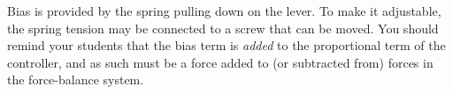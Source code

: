 





Bias is provided by the spring pulling down on the lever.  To make it adjustable, the spring tension may be connected to a screw that can be moved.  You should remind your students that the bias term is {\it added} to the proportional term of the controller, and as such must be a force added to (or subtracted from) forces in the force-balance system.




